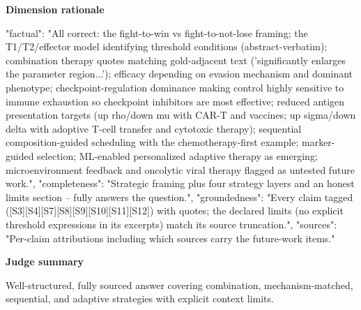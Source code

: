 \documentclass[10pt]{article}
\begin{document}
\textbf{Dimension rationale}
\begin{EvidenceText}
{
  "factual": "All correct: the fight-to-win vs fight-to-not-lose framing; the T1/T2/effector model identifying threshold conditions (abstract-verbatim); combination therapy quotes matching gold-adjacent text ('significantly enlarges the parameter region...'); efficacy depending on evasion mechanism and dominant phenotype; checkpoint-regulation dominance making control highly sensitive to immune exhaustion so checkpoint inhibitors are most effective; reduced antigen presentation targets (up rho/down mu with CAR-T and vaccines; up sigma/down delta with adoptive T-cell transfer and cytotoxic therapy); sequential composition-guided scheduling with the chemotherapy-first example; marker-guided selection; ML-enabled personalized adaptive therapy as emerging; microenvironment feedback and oncolytic viral therapy flagged as untested future work.",
  "completeness": "Strategic framing plus four strategy layers and an honest limits section -- fully answers the question.",
  "groundedness": "Every claim tagged ([S3][S4][S7][S8][S9][S10][S11][S12]) with quotes; the declared limits (no explicit threshold expressions in its excerpts) match its source truncation.",
  "sources": "Per-claim attributions including which sources carry the future-work items."
}
\end{EvidenceText}

\textbf{Judge summary}
\begin{EvidenceText}
Well-structured, fully sourced answer covering combination, mechanism-matched, sequential, and adaptive strategies with explicit context limits.
\end{EvidenceText}
\end{document}
